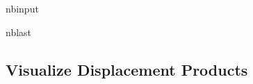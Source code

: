 \documentclass[letterpaper,10pt,english]{sphinxmanual}
\begin{document}
\begin{sphinxuseclass}{nbinput}
\begin{sphinxuseclass}{nblast}
{\begin{sphinxVerbatim}[commandchars=\\\{\}]
                                           
\end{sphinxVerbatim}
}

\end{sphinxuseclass}
\end{sphinxuseclass}

\subsection{Visualize Displacement Products}
\label{\detokenize{notebooks/MudCreek_Landslide_optical:Visualize-Displacement-Products}}
\end{document}
